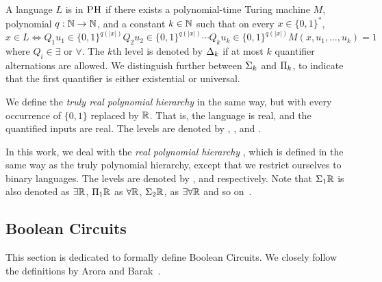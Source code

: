 \documentclass{article}
\begin{document}
\begin{definition}
\label{def:PH}
A language  $L$ is in $\textsc{PH}$ if there exists a polynomial-time Turing machine $M$, polynomial $q:\mathbb{N} \rightarrow \mathbb{N}$, and a constant $k \in \mathbb{N}$ such that on every $x \in \{0,1\}^{*}$,
\begin{equation*}
    x \in L \iff Q_1 u_1 \in \{0,1\}^{q(|x|)} Q_2 u_2 \in \{0,1\}^{q(|x|)} \cdots Q_k u_k \in \{0,1\}^{q(|x|)} M(x, u_1,\ldots,u_k)=1
\end{equation*}
where $Q_i \in \exists$ or $\forall$.
The $k$th level is denoted by $\Delta_{k}$ if at most $k$ quantifier alternations are allowed.
We distinguish further between $\Sigma_{k}$ and $\Pi_{k}$, to indicate that the first quantifier is either existential or universal.

We define the \textit{truly real polynomial hierarchy} \TrulyRPH in the same way, but with every occurrence of $\{0,1\}$
replaced by $\mathbb{R}$.
That is, the language is real, and the quantified inputs are real.
The levels are denoted by , , and .

In this work, we deal with the \textit{real polynomial hierarchy} \RPH, which is defined in the same way as the truly polynomial hierarchy, except that we restrict ourselves to binary languages.
The levels are denoted by ,  and  respectively.
Note that $\Sigma_{1}\mathbb{R}$ is also denoted as $\exists\mathbb{R}$, $\Pi_{1}\mathbb{R}$ as $\forall \mathbb{R}$,
$\Sigma_{2}\mathbb{R}$, as $\exists \forall \mathbb{R}$ and so on~\cite{BC09,JKM23, DKMR18, JJ23}.
\end{definition}


\subsection{Boolean Circuits}

This section is dedicated to formally define Boolean Circuits.
We closely follow the definitions by Arora and Barak~\cite{AB09}.
\end{document}
